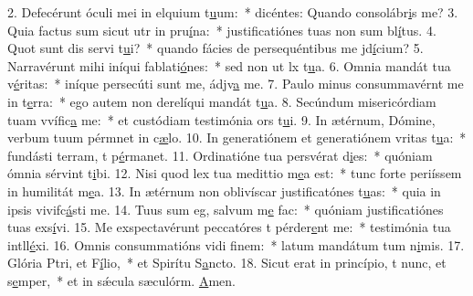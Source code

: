 2. Defecérunt óculi mei in elquium t\uline{u}um:~* dicéntes: Quando consolábr\uline{i}s me?
3. Quia factus sum sicut utr in pru\uline{í}na:~* justificatiónes tuas non sum bl\uline{í}tus.
4. Quot sunt dis servi t\uline{u}i?~* quando fácies de persequéntibus me jd\uline{í}cium?
5. Narravérunt mihi iníqui fablati\uline{ó}nes:~* sed non ut lx t\uline{u}a.
6. Omnia mandát tua v\uline{é}ritas:~* iníque persecúti sunt me, ádjv\uline{a} me.
7. Paulo minus consummavérnt me in t\uline{e}rra:~* ego autem non derelíqui mandát t\uline{u}a.
8. Secúndum misericórdiam tuam vvífic\uline{a} me:~* et custódiam testimónia ors t\uline{u}i.
9. In ætérnum, Dómine, verbum tuum pérmnet in c\uline{æ}lo.
10. In generatiónem et generatiónem vritas t\uline{u}a:~* fundásti terram, t p\uline{é}rmanet.
11. Ordinatióne tua persvérat d\uline{i}es:~* quóniam ómnia sérvint t\uline{i}bi.
12. Nisi quod lex tua medittio m\uline{e}a est:~* tunc forte periíssem in humilitát m\uline{e}a.
13. In ætérnum non oblivíscar justificatónes t\uline{u}as:~* quia in ipsis vivifc\uline{á}sti me.
14. Tuus sum eg, salvum m\uline{e} fac:~* quóniam justificatiónes tuas exs\uline{í}vi.
15. Me exspectavérunt peccatóres t pérder\uline{e}nt me:~* testimónia tua intll\uline{é}xi.
16. Omnis consummatións vidi f\uline{i}nem:~* latum mandátum tum n\uline{i}mis.
17. Glória Ptri, et F\uline{í}lio,~* et Spirítu S\uline{a}ncto.
18. Sicut erat in princípio, t nunc, et s\uline{e}mper,~* et in sǽcula sæculórm. \uline{A}men.
